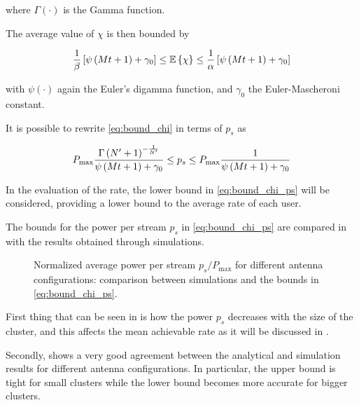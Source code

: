 \noindent
where $\Gamma\left(\cdot\right)$ is the Gamma function.

The average value of $\chi$ is then bounded by

\begin{equation} \label{eq:bound_chi}
    \frac{1}{\beta}\left[\psi\left(Mt + 1\right) + \gamma_0\right] \leq
    \mathbb{E}\left\{\chi\right\} \leq
    \frac{1}{\alpha}\left[\psi\left(Mt + 1\right) + \gamma_0\right]
\end{equation}

\noindent
with $\psi\left(\cdot\right)$ again the Euler's digamma function, and $\gamma_0$ the Euler-Mascheroni
constant.

It is possible to rewrite \eqref{eq:bound_chi} in terms of $p_s$ as

\begin{equation} \label{eq:bound_chi_ps}
    P_{\max} \frac{\Gamma\left(N^{\prime} + 1\right)^{-\frac{1}{N^{\prime}}}}
        {\psi\left(Mt + 1\right) + \gamma_0} \leq p_s \leq
        P_{\max}\frac{1}{\psi\left(Mt + 1\right) + \gamma_0}
\end{equation}

In the evaluation of the rate, the lower bound in \eqref{eq:bound_chi_ps} will
be considered, providing a lower bound to the average rate of each user.

The bounds for the power per stream $p_s$ in \eqref{eq:bound_chi_ps} are
compared in  with the results obtained through simulations.

\begin{figure}[t]
\begin{center}
    \hspace*{-0mm}
\end{center}
\caption{Normalized average power per stream $p_s / P_{\max}$ for different
antenna configurations: comparison between simulations and the bounds in
\eqref{eq:bound_chi_ps}.}
\label{fig:bound_chi}
\end{figure}

First thing that can be seen in  is how the power $p_s$
decreases with the size of the cluster, and this affects the mean achievable
rate as it will be discussed in .

Secondly,  shows a very good agreement between the
analytical and simulation results for different antenna configurations. In
particular, the upper bound is tight for small clusters while the lower bound
becomes more accurate for bigger clusters.

